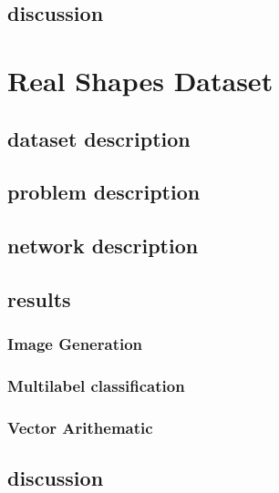 \subsection{discussion}

\section{Real Shapes Dataset}
\subsection{dataset description}
\subsection{problem description}
\subsection{network description}
\subsection{results}

\subsubsection{Image Generation}
\subsubsection{Multilabel classification}
\subsubsection{Vector Arithematic}

\subsection{discussion}